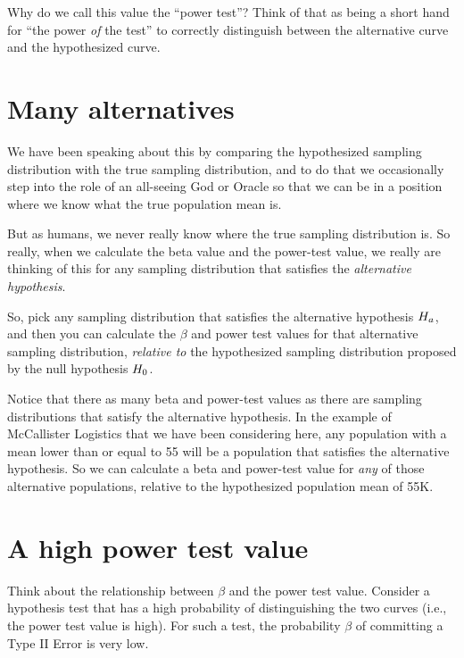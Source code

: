 \documentclass[../../../main.tex]{subfiles}
\begin{document}
\noindent
Why do we call this value the ``power test''? Think of that as being a short hand for ``the power \emph{of} the test'' to correctly distinguish between the alternative curve and the hypothesized curve. 


\section{Many alternatives}

We have been speaking about this by comparing the hypothesized sampling distribution with the true sampling distribution, and to do that we occasionally step into the role of an all-seeing God or Oracle so that we can be in a position where we know what the true population mean is. 

But as humans, we never really know where the true sampling distribution is. So really, when we calculate the beta value and the power-test value, we really are thinking of this for any sampling distribution that satisfies the \emph{alternative hypothesis}. 

So, pick any sampling distribution that satisfies the alternative hypothesis $\AltHyp/$, and then you can calculate the $\beta$ and power test values for that alternative sampling distribution, \emph{relative to} the hypothesized sampling distribution proposed by the null hypothesis $\NullHyp/$.

Notice that there as many beta and power-test values as there are sampling distributions that satisfy the alternative hypothesis. In the example of McCallister Logistics that we have been considering here, any population with a mean lower than or equal to 55 will be a population that satisfies the alternative hypothesis. So we can calculate a beta and power-test value for \emph{any} of those alternative populations, relative to the hypothesized population mean of 55K.


\section{A high power test value}

Think about the relationship between $\beta$ and the power test value. Consider a hypothesis test that has a high probability of distinguishing the two curves (i.e., the power test value is high). For such a test, the probability $\beta$ of committing a Type II Error is very low. 
\end{document}
